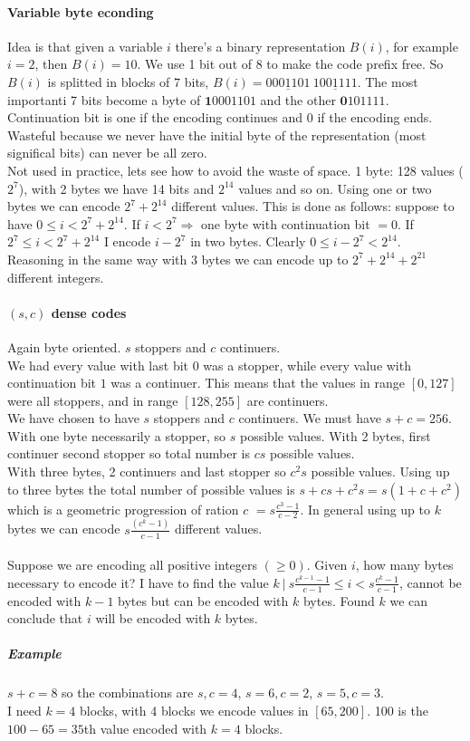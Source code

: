 \documentclass[10pt]{report}
\begin{document}
\paragraph{Variable byte econding} Idea is that given a variable $i$ there's a binary representation $B(i)$, for example $i = 2$, then $B(i) = 10$. We use 1 bit out of 8 to make the code prefix free. So $B(i)$ is splitted in blocks of 7 bits, $B(i) = \underline{\textit{000}1101}\:\underline{1001111}$. The most importanti 7 bits become a byte of $\textbf{1}0001101$ and the other $\textbf{0}101111$. Continuation bit is one if the encoding continues and 0 if the encoding ends.\\
Wasteful because we never have the initial byte of the representation (most significal bits) can never be all zero.\\
Not used in practice, lets see how to avoid the waste of space. 1 byte: 128 values ($2^7$), with 2 bytes we have 14 bits and $2^{14}$ values and so on. Using one or two bytes we can encode $2^7 + 2^{14}$ different values. This is done as follows: suppose to have $0\leq i < 2^7 + 2^{14}$. If $i < 2^7 \Rightarrow$ one byte with continuation bit $= 0$. If $2^7 \leq i < 2^7 + 2^{14}$ I encode $i-2^7$ in two bytes. Clearly $0\leq i - 2^7 < 2^{14}$.\\
Reasoning in the same way with 3 bytes we can encode up to $2^7 + 2^{14} + 2^{21}$ different integers.
\paragraph{$(s, c)$ dense codes} Again byte oriented. $s$ stoppers and $c$ continuers.\\
We had every value with last bit $0$ was a stopper, while every value with continuation bit $1$ was a continuer. This means that the values in range $[0, 127]$ were all stoppers, and in range $[128, 255]$ are continuers.\\
We have chosen to have $s$ stoppers and $c$ continuers. We must have $s + c = 256$. With one byte necessarily a stopper, so $s$ possible values. With 2 bytes, first continuer second stopper so total number is $cs$ possible values.\\With three bytes, 2 continuers and last stopper so $c^2 s$ possible values. Using up to three bytes the total number of possible values is $s + cs + c^2s = s(1 + c + c^2)$ which is a geometric progression of ration $c$ $=s\frac{c^3 - 1}{c-2}$. In general using up to $k$ bytes we can encode $s\frac{(c^k - 1)}{c-1}$ different values.\\\\
Suppose we are encoding all positive integers $(\geq 0)$. Given $i$, how many bytes necessary to encode it? I have to find the value $k\:|\:s\frac{c^{k-1} - 1}{c-1}\leq i < s\frac{c^k-1}{c-1}$, cannot be encoded with $k-1$ bytes but can be encoded with $k$ bytes. Found $k$ we can conclude that $i$ will be encoded with $k$ bytes.
\subparagraph{Example} $s+c = 8$ so the combinations are $s, c = 4$, $s = 6, c = 2$, $s = 5, c = 3$.\\
I need $k=4$ blocks, with 4 blocks we encode values in $[65, 200]$. 100 is the $100-65 = 35$th value encoded with $k=4$ blocks.
\end{document}
